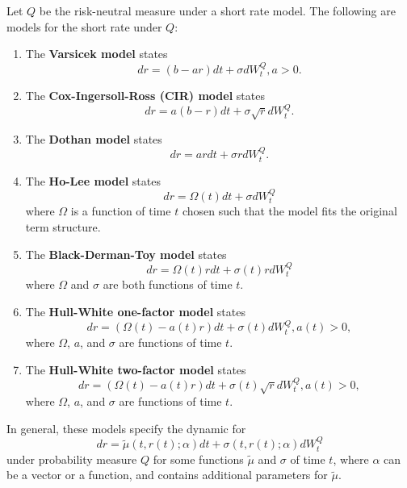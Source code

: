 \documentclass[11pt,fleqn]{book} %
\begin{document}
\begin{definition} \label{def:531}
Let \(Q\) be the risk-neutral measure under a short rate model. The following are models for the short rate under \(Q\):
\begin{enumerate}
\item The \textbf{Varsicek model} states
\[
dr = (b - ar)dt + \sigma dW_t^Q, a > 0.
\]
\item The \textbf{Cox-Ingersoll-Ross (CIR) model} states
\[
dr = a(b - r)dt + \sigma\sqrt{r}dW_t^Q.
\]
\item The \textbf{Dothan model} states
\[
dr = ar dt + \sigma rdW_t^Q.
\]
\item The \textbf{Ho-Lee model} states
\[
dr = \Omega(t)dt + \sigma dW_t^Q
\]
where \(\Omega\) is a function of time \(t\) chosen such that the model fits the original term structure.
\item The \textbf{Black-Derman-Toy model} states
\[
dr = \Omega(t) rdt + \sigma(t)rdW_t^Q
\]
where \(\Omega\) and \(\sigma\) are both functions of time \(t\).
\item The \textbf{Hull-White one-factor model} states
\[
dr = (\Omega(t) - a(t)r)dt + \sigma(t)dW_t^Q, a(t) > 0,
\]
where \(\Omega\), \(a\), and \(\sigma\) are functions of time \(t\).
\item The \textbf{Hull-White two-factor model} states
\[
dr = (\Omega(t) - a(t)r)dt + \sigma(t)\sqrt{r} dW_t^Q, a(t) > 0,
\]
where \(\Omega\), \(a\), and \(\sigma\) are functions of time \(t\).
\end{enumerate}
\indent In general, these models specify the dynamic for
\[
dr = \tilde{\mu}(t, r(t); \alpha)dt + \sigma(t, r(t); \alpha)dW_t^Q
\]
under probability measure \(Q\) for some functions \(\tilde{\mu}\) and \(\sigma\) of time \(t\), where \(\alpha\) can be a vector or a function, and contains additional parameters for \(\tilde{\mu}\).
\end{definition}
\end{document}
